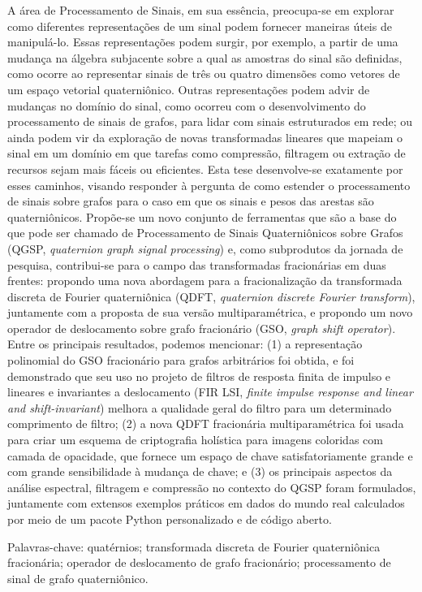 
%

A área de Processamento de Sinais, em sua essência, preocupa-se em explorar como diferentes representações de um sinal podem fornecer maneiras úteis de manipulá-lo. Essas representações podem surgir, por exemplo, a partir de uma mudança na álgebra subjacente sobre a qual as amostras do sinal são definidas, como ocorre ao representar sinais de três ou quatro dimensões como vetores de um espaço vetorial quaterniônico. Outras representações podem advir de mudanças no domínio do sinal, como ocorreu com o desenvolvimento do processamento de sinais de grafos, para lidar com sinais estruturados em rede; ou ainda podem vir da exploração de novas transformadas lineares que mapeiam o sinal em um domínio em que tarefas como compressão, filtragem ou extração de recursos sejam mais fáceis ou eficientes.
Esta tese desenvolve-se exatamente por esses caminhos, visando responder à pergunta de como estender o processamento de sinais sobre grafos para o caso em que os sinais e pesos das arestas são quaterniônicos. Propõe-se um novo conjunto de ferramentas que são a base do que pode ser chamado de Processamento de Sinais Quaterniônicos sobre Grafos (QGSP, \emph{quaternion graph signal processing}) e, como subprodutos da jornada de pesquisa, contribui-se para o campo das transformadas fracionárias em duas frentes: propondo uma nova abordagem para a fracionalização da transformada discreta de Fourier quaterniônica (QDFT, \emph{quaternion discrete Fourier transform}), juntamente com a proposta de sua versão multiparamétrica, e propondo um novo operador de deslocamento sobre grafo fracionário (GSO, \emph{graph shift operator}).
Entre os principais resultados, podemos mencionar: (1) a representação polinomial do GSO fracionário para grafos arbitrários foi obtida, e foi demonstrado que seu uso no projeto de filtros de resposta finita de impulso e lineares e invariantes a deslocamento (FIR LSI, \emph{finite impulse response and linear and shift-invariant}) melhora a qualidade geral do filtro para um determinado comprimento de filtro; (2) a nova QDFT fracionária multiparamétrica foi usada para criar um esquema de criptografia holística para imagens coloridas com camada de opacidade, que fornece um espaço de chave satisfatoriamente grande e com grande sensibilidade à mudança de chave; e (3) os principais aspectos da análise espectral, filtragem e compressão no contexto do QGSP foram formulados, juntamente com extensos exemplos práticos em dados do mundo real calculados por meio de um pacote Python personalizado e de código aberto.
\vspace{1em}

Palavras-chave: quatérnios; transformada discreta de Fourier quaterniônica fracionária; operador de deslocamento de grafo fracionário; processamento de sinal de grafo quaterniônico.